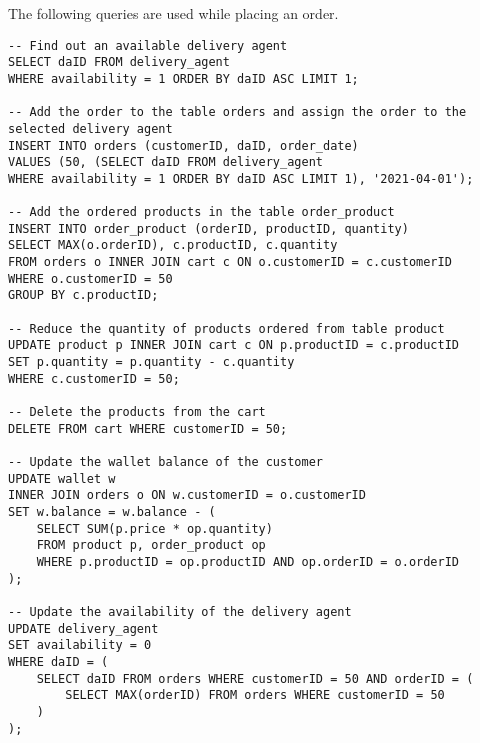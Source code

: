 The following queries are used while placing an order.

\begin{lstlisting}
-- Find out an available delivery agent
SELECT daID FROM delivery_agent
WHERE availability = 1 ORDER BY daID ASC LIMIT 1;

-- Add the order to the table orders and assign the order to the selected delivery agent
INSERT INTO orders (customerID, daID, order_date)
VALUES (50, (SELECT daID FROM delivery_agent
WHERE availability = 1 ORDER BY daID ASC LIMIT 1), '2021-04-01');

-- Add the ordered products in the table order_product
INSERT INTO order_product (orderID, productID, quantity)
SELECT MAX(o.orderID), c.productID, c.quantity
FROM orders o INNER JOIN cart c ON o.customerID = c.customerID
WHERE o.customerID = 50
GROUP BY c.productID;

-- Reduce the quantity of products ordered from table product
UPDATE product p INNER JOIN cart c ON p.productID = c.productID
SET p.quantity = p.quantity - c.quantity
WHERE c.customerID = 50;

-- Delete the products from the cart
DELETE FROM cart WHERE customerID = 50;

-- Update the wallet balance of the customer
UPDATE wallet w
INNER JOIN orders o ON w.customerID = o.customerID
SET w.balance = w.balance - (
    SELECT SUM(p.price * op.quantity)
    FROM product p, order_product op
    WHERE p.productID = op.productID AND op.orderID = o.orderID
);

-- Update the availability of the delivery agent
UPDATE delivery_agent
SET availability = 0
WHERE daID = (
    SELECT daID FROM orders WHERE customerID = 50 AND orderID = (
        SELECT MAX(orderID) FROM orders WHERE customerID = 50
    )
);
\end{lstlisting}